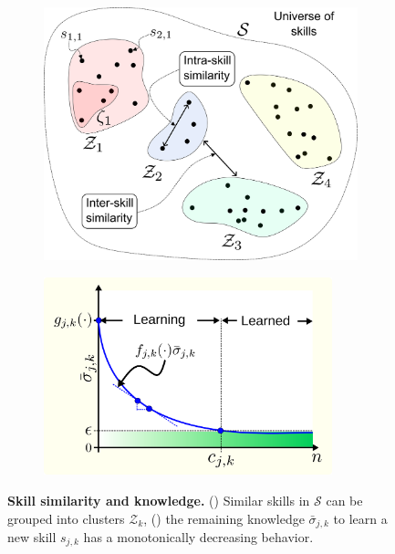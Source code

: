 \documentclass[12pt]{article}
\begin{document}
\begin{figure}[!t]
	\centering
	\hspace*{\fill}
	\begin{subfigure}[t]{0.45\textwidth}
		\subcaption{}
		\includegraphics[width= \textwidth]{skill_similarity.png} \label{fig:skill_similarity}
	\end{subfigure}
	\hfill
	\begin{subfigure}[t]{8.35cm}	
		\subcaption{}
		\includegraphics[width=8.35cm]{remaining_knowledge_dynamics_idealization.png} \label{fig:knowledge_idealization}
	\end{subfigure}
	\hspace*{\fill}
	\caption[] {\label{fig:experimental_results} \textbf{Skill similarity and knowledge.} () Similar skills in $\mathcal{S}$ can be grouped into clusters $\mathcal{Z}_k$, () the remaining knowledge $\bar{\sigma}_{j,k}$ to learn a new skill $s_{j,k}$ has a monotonically decreasing behavior.}	
\end{figure}
\end{document}
